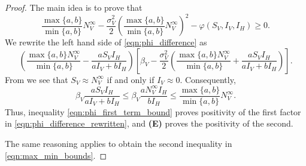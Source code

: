 \begin{proof}
    The main idea is to prove that
    \begin{equation}
        \label{eqn:phi_difference}
        \frac{
            \max\{a,b\}
        }{
            \min \{a, b\}
        }
          N_V ^ {\infty}
        - 
        \frac{\sigma_V ^ 2}{2}
        \left(
            \frac{
                \max\{a,b\}
            }{
                \min \{a, b\}
            } N_V ^ {\infty}
        \right) ^ 2
        -
        \varphi (S_V, I_V, I_H) 
        \geq 
        0.
    \end{equation}
    We rewrite the left hand side of \eqref{eqn:phi_difference} as
%
    \begin{equation}
    \label{eqn:phi_difference_rewritten}
        \left(
            \frac{
                \max \{a,b\}
            N_V ^ \infty
            }{
                \min \{a,b\}
            }
%            
            -
            \frac{ a S_V I_H}{a I_V + b I_H}
        \right)
        \left[
            \beta_V
            -
            \frac{\sigma_V ^ 2}{2}
            \left(
                \frac{
                    \max \{a,b\}
                    N_V ^ \infty
                }{
                    \min \{a,b\}
                }
                +
                \frac{a S_V I_H}{a I_V + b I_H}
            \right)
        \right].
    \end{equation}
%
    From  we see that
    $S_V \approx N_V ^ \infty$ if and only if $I_V \approx 0$. Consequently,
    \begin{equation}\label{eqn:phi_first_term_bound}
        \beta_V
            \frac{a S_V I_H}{a I_V + b I_H}
        \leq
         \beta_V
            \frac{a N_V ^ \infty I_H}{b I_H}
        \leq
            \frac{
                \max \{ a,b \} 
            }{
                \min\{ a, b\}
            }
             N_V ^ \infty.
    \end{equation}
    Thus, inequality \eqref{eqn:phi_first_term_bound} proves
    positivity of the first factor in \eqref{eqn:phi_difference_rewritten},
    and \textsc{ \textbf{(E)}} proves the positivity of the 
    second.
    
        The same reasoning applies to obtain the second inequality in 
    \eqref{eqn:max_min_bounds}.
\end{proof}


%
